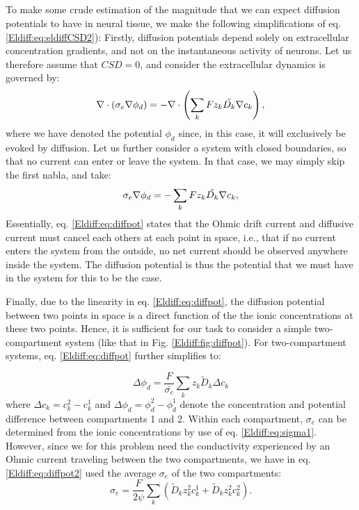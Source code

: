 \subsection{}
To make some crude estimation of the magnitude that we can expect diffusion potentials to have in neural tissue, we make the following simplifications of eq. \ref{Eldiff:eq:eldiffCSD2}): Firstly, diffusion potentials depend solely on extracellular concentration gradients, and not on the instantaneous activity of neurons. Let us therefore assume that $CSD = 0$, and consider the extracellular dynamics is governed by:
\begin{equation}
\nabla \cdot (\sigma_e\nabla\phi_d) = - \nabla \cdot \left (\sum_k{F z_k \tilde{D_k}{\bf \nabla} c_{k}} \right), 
\label{Eldiff:eq:eldiffCSD3}
\end{equation}
where we have denoted the potential $\phi_d$ since, in this case, it will exclusively be evoked by diffusion. Let us further consider a system with closed boundaries, so that no current can enter or leave the system. In that case, we may simply skip the first nabla, and take:
\begin{equation}
\sigma_e\nabla\phi_d = -\sum_k{F z_k \tilde{D_k}{\bf \nabla} c_{k}}, 
\label{Eldiff:eq:diffpot}
\end{equation}
Essentially, eq. \ref{Eldiff:eq:diffpot} states that the Ohmic drift current and diffusive current must cancel each others at each point in space, i.e., that if no current enters the system from the outside, no net current should be observed anywhere inside the system. The diffusion potential is thus the potential that we must have in the system for this to be the case. 

Finally, due to the linearity in eq. \ref{Eldiff:eq:diffpot}, the diffusion potential between two points in space is a direct function of the the ionic concentrations at these two points. Hence, it is sufficient for our task to consider a simple two-compartment system (like that in Fig. \ref{Eldiff:fig:diffpot}). For two-compartment systems, eq. \ref{Eldiff:eq:diffpot} further simplifies to:

\begin{equation}
\Delta \phi_d = \frac{F}{\bar{\sigma_e}} \sum_k{z_k \tilde{D}_k \Delta c_k}
\label{Eldiff:eq:diffpot2}
\end{equation}
where $\Delta c_k = c_{k}^{2} - c_{k}^{1}$ and $\Delta \phi_d = \phi_d^{2} - \phi_d^{1}$ denote the concentration and potential difference between compartments 1 and 2. Within each compartment, $\sigma_e$ can be determined from the ionic concentrations by use of eq. \ref{Eldiff:eq:sigma1}. However, since we for this problem need the conductivity experienced by an Ohmic current traveling between the two compartments, we have in eq. \ref{Eldiff:eq:diffpot2} used the average $\sigma_e$ of the two compartments:
\begin{equation}
\sigma_e = \frac{F}{2\psi}\sum_{k} \left(\tilde{D}_k z_{k}^2 c_{k}^{1} + \tilde{D}_k z_{k}^2 c_{k}^{2} \right).
\label{Eldiff:eq:sigma2}
\end{equation}

